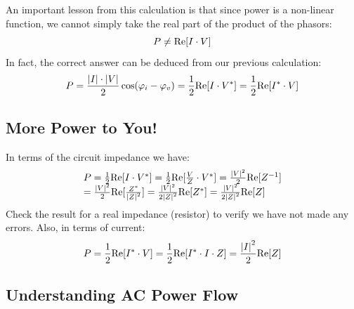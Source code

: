 An important lesson from this calculation is that since power is a non-linear function, we cannot simply take the real part of the product of the phasors:
\begin{equation}
	P \ne {\mathop{\rm Re}\nolimits} [I \cdot V]
\end{equation}
In fact, the correct answer can be deduced from our previous calculation:
\begin{equation}
	P = \frac{{\left| I \right| \cdot \left| V \right|}}{2}\cos ({\varphi _i} - {\varphi _v}) = \frac{1}{2}{\mathop{\rm Re}\nolimits} [I \cdot {V^*}] = \frac{1}{2}{\mathop{\rm Re}\nolimits} [{I^*} \cdot V]
\end{equation}


\subsection{More Power to You!}

In terms of the circuit impedance we have:
\begin{equation}
\begin{array}{l}
	P = \frac{1}{2}{\mathop{\rm Re}\nolimits} [I \cdot {V^*}] = \frac{1}{2}{\mathop{\rm Re}\nolimits} [\frac{V}{Z} \cdot {V^*}] = \frac{{{{\left| V \right|}^2}}}{2}{\mathop{\rm Re}\nolimits} [{Z^{ - 1}}]\\
   = \frac{{{{\left| V \right|}^2}}}{2}{\mathop{\rm Re}\nolimits} [\frac{{{Z^*}}}{{{{\left| Z \right|}^2}}}] = \frac{{{{\left| V \right|}^2}}}{{2{{\left| Z \right|}^2}}}{\mathop{\rm Re}\nolimits} [{Z^*}] = \frac{{{{\left| V \right|}^2}}}{{2{{\left| Z \right|}^2}}}{\mathop{\rm Re}\nolimits} [Z]
\end{array}
\end{equation}
Check the result for a real impedance (resistor) to verify we have not made any errors.   Also, in terms of current:
\begin{equation}
	P = \frac{1}{2}{\mathop{\rm Re}\nolimits} [{I^*} \cdot V] = \frac{1}{2}{\mathop{\rm Re}\nolimits} [{I^*} \cdot I \cdot Z] = \frac{{{{\left| I \right|}^2}}}{2}{\mathop{\rm Re}\nolimits} [Z]
\end{equation}

 




\subsection{Understanding AC Power Flow}


